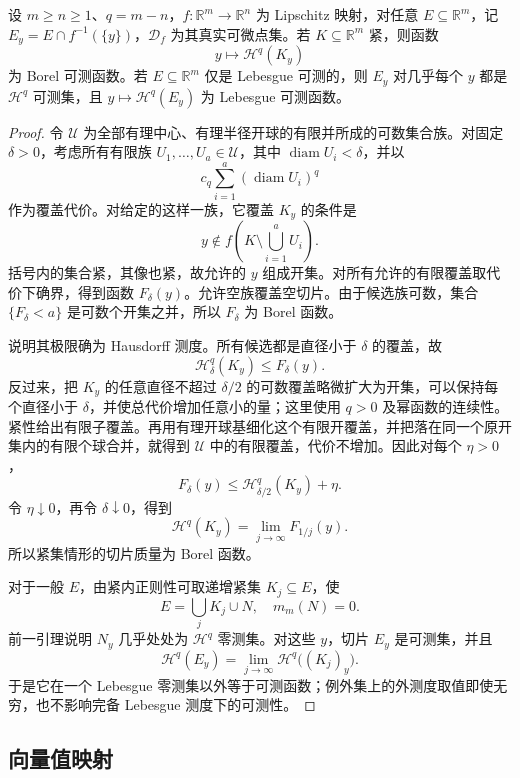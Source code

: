 \begin{lemma}\label{b1:lem:slice-measure-measurable}
设 \(m\ge n\ge1\)、\(q=m-n\)，\(f:\mathbb R^m\to\mathbb R^n\) 为 Lipschitz 映射，对任意 \(E\subseteq\mathbb R^m\)，记 \(E_y=E\cap f^{-1}(\{y\})\)，\(\mathcal D_f\) 为其真实可微点集。若 \(K\subseteq\mathbb R^m\) 紧，则函数
\[
 y\longmapsto\mathcal H^q(K_y)
\]
为 Borel 可测函数。若 \(E\subseteq\mathbb R^m\) 仅是 Lebesgue 可测的，则 \(E_y\) 对几乎每个 \(y\) 都是 \(\mathcal H^q\) 可测集，且 \(y\mapsto\mathcal H^q(E_y)\) 为 Lebesgue 可测函数。
\end{lemma}
\begin{proof}
令 \(\mathscr U\) 为全部有理中心、有理半径开球的有限并所成的可数集合族。对固定 \(\delta>0\)，考虑所有有限族 \(U_1,\ldots,U_a\in\mathscr U\)，其中 \(\operatorname{diam}U_i<\delta\)，并以
\[
 c_q\sum_{i=1}^a(\operatorname{diam}U_i)^q
\]
作为覆盖代价。对给定的这样一族，它覆盖 \(K_y\) 的条件是
\[
 y\notin f\left(K\setminus\bigcup_{i=1}^aU_i\right).
\]
括号内的集合紧，其像也紧，故允许的 \(y\) 组成开集。对所有允许的有限覆盖取代价下确界，得到函数 \(F_\delta(y)\)。允许空族覆盖空切片。由于候选族可数，集合 \(\{F_\delta<a\}\) 是可数个开集之并，所以 \(F_\delta\) 为 Borel 函数。

说明其极限确为 Hausdorff 测度。所有候选都是直径小于 \(\delta\) 的覆盖，故
\[
 \mathcal H^q_\delta(K_y)\leq F_\delta(y).
\]
反过来，把 \(K_y\) 的任意直径不超过 \(\delta/2\) 的可数覆盖略微扩大为开集，可以保持每个直径小于 \(\delta\)，并使总代价增加任意小的量；这里使用 \(q>0\) 及幂函数的连续性。紧性给出有限子覆盖。再用有理开球基细化这个有限开覆盖，并把落在同一个原开集内的有限个球合并，就得到 \(\mathscr U\) 中的有限覆盖，代价不增加。因此对每个 \(\eta>0\)，
\[
 F_\delta(y)\leq\mathcal H^q_{\delta/2}(K_y)+\eta.
\]
令 \(\eta\downarrow0\)，再令 \(\delta\downarrow0\)，得到
\[
 \mathcal H^q(K_y)=\lim_{j\to\infty}F_{1/j}(y).
\]
所以紧集情形的切片质量为 Borel 函数。

对于一般 \(E\)，由紧内正则性可取递增紧集 \(K_j\subseteq E\)，使
\[
 E=\bigcup_jK_j\cup N,\quad m_m(N)=0.
\]
前一引理说明 \(N_y\) 几乎处处为 \(\mathcal H^q\) 零测集。对这些 \(y\)，切片 \(E_y\) 是可测集，并且
\[
 \mathcal H^q(E_y)=\lim_{j\to\infty}\mathcal H^q\bigl((K_j)_y\bigr).
\]
于是它在一个 Lebesgue 零测集以外等于可测函数；例外集上的外测度取值即使无穷，也不影响完备 Lebesgue 测度下的可测性。
\end{proof}

\subsection{向量值映射}
\label{b1:subsec:180202}

